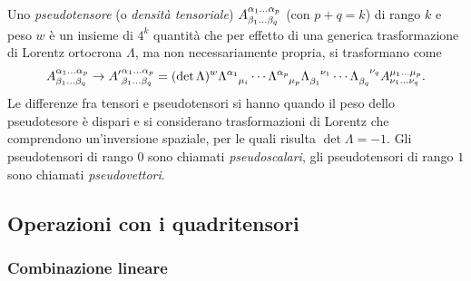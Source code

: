 Uno \emph{pseudotensore} (o
\emph{densità tensoriale})
$\tensor*{A}{^{\alpha_{1}\dots\alpha_{p}}_{\beta_{1}\dots\beta_{q}}}$ (con
$p+q=k$) di rango $k$ e peso $w$ è un insieme di $4^{k}$ quantità che per
effetto di una generica trasformazione di Lorentz ortocrona $\Lambda$, ma non
necessariamente propria, si trasformano come
\begin{equation}
  \tensor*{A}{^{\alpha_{1}\dots\alpha_{p}}_{\beta_{1}\dots\beta_{q}}} \to
  \tensor*{{A'}}{^{\alpha_{1}\dots\alpha_{p}}_{\beta_{1}\dots\beta_{q}}}
  = (\det \Lambda)^{w} \tensor{\Lambda}{^{\alpha_{1}}_{\mu_{i}}} \cdots
  \tensor{\Lambda}{^{\alpha_{p}}_{\mu_{p}}}
  \tensor{\Lambda}{_{\beta_{1}}^{\nu_{1}}} \cdots
  \tensor{\Lambda}{_{\beta_{q}}^{\nu_{q}}}
  \tensor*{A}{^{\mu_{1}\dots\mu_{p}}_{\nu_{1}\dots\nu_{q}}}.
\end{equation}
Le differenze fra tensori e pseudotensori si hanno quando il peso dello
pseudotesore è dispari e si considerano trasformazioni di Lorentz che
comprendono un'inversione spaziale, per le quali risulta $\det\Lambda = -1$.
Gli pseudotensori di rango $0$ sono chiamati \emph{pseudoscalari}, gli
pseudotensori di rango $1$ sono chiamati \emph{pseudovettori}.

\subsection{Operazioni con i quadritensori}
\label{sec:operazioni-tensori-minkowski}

\subsubsection{Combinazione lineare}
\label{sec:combinazione-lineare-minkowski}

